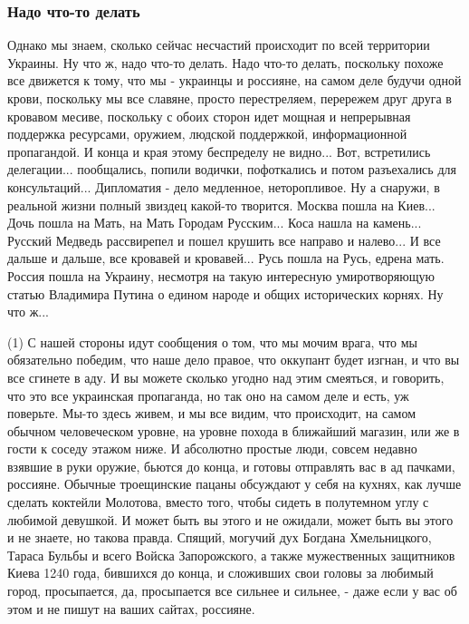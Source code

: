  
 
 
 
 

\subsubsection{Надо что-то делать}

Однако мы знаем, сколько сейчас несчастий происходит по всей территории
Украины. Ну что ж, надо что-то делать. Надо что-то делать, поскольку похоже все
движется к тому, что мы - украинцы и россияне, на самом деле будучи одной
крови, поскольку мы все славяне, просто перестреляем, перережем друг друга в
кровавом месиве, поскольку с обоих сторон идет мощная и непрерывная поддержка
ресурсами, оружием, людской поддержкой, информационной пропагандой. И конца и
края этому беспределу не видно... Вот, встретились делегации... пообщались,
попили водички, пофоткались и потом разъехались для консультаций... Дипломатия
- дело медленное, неторопливое. Ну а снаружи, в реальной жизни полный звиздец
какой-то творится. Москва пошла на Киев... Дочь пошла на Мать, на Мать Городам
Русским... Коса нашла на камень... Русский Медведь рассвирепел и пошел крушить
все направо и налево... И все дальше и дальше, все кровавей и кровавей... Русь
пошла на Русь, едрена мать. Россия пошла на Украину, несмотря на такую
интересную умиротворяющую статью Владимира Путина о едином народе и общих
исторических корнях. Ну что ж... 

(1) С нашей стороны идут сообщения о том, что мы мочим врага, что мы
обязательно победим, что наше дело правое, что оккупант будет изгнан, и что вы
все сгинете в аду. И вы можете сколько угодно над этим смеяться, и говорить,
что это все украинская пропаганда, но так оно на самом деле и есть, уж
поверьте.  Мы-то здесь живем, и мы все видим, что происходит, на самом обычном
человеческом уровне, на уровне похода в ближайший магазин, или же в гости к
соседу этажом ниже. И абсолютно простые люди, совсем недавно взявшие в руки
оружие, бьются до конца, и готовы отправлять вас в ад пачками, россияне.
Обычные троещинские пацаны обсуждают у себя на кухнях, как лучше сделать
коктейли Молотова, вместо того, чтобы сидеть в полутемном углу с любимой
девушкой. И может быть вы этого и не ожидали, может быть вы этого и не знаете,
но такова правда.  Спящий, могучий дух Богдана Хмельницкого, Тараса Бульбы и
всего Войска Запорожского, а также мужественных защитников Киева 1240 года,
бившихся до конца, и сложивших свои головы за любимый город, просыпается, да,
просыпается все сильнее и сильнее, - даже если у вас об этом и не пишут на
ваших сайтах, россияне.

